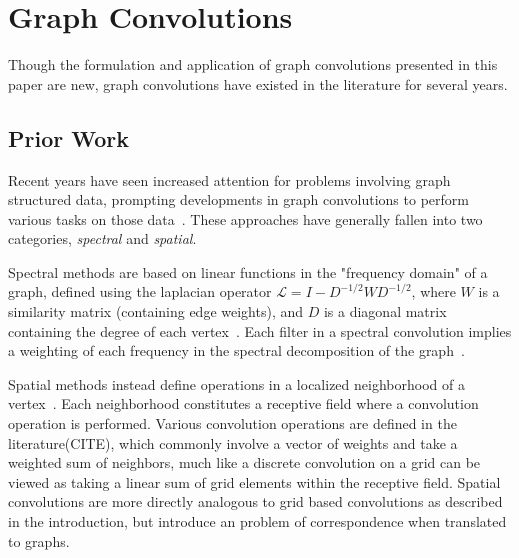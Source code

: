 \section{Graph Convolutions}
Though the formulation and application of graph convolutions presented in this paper are new, graph convolutions have existed in the literature for several years.


\subsection{Prior Work}
Recent years have seen increased attention for problems involving graph structured data, prompting developments in graph convolutions to perform various tasks on those data~\cite{bronstein2016}.
These approaches have generally fallen into two categories, \textit{spectral} and \textit{spatial}.

Spectral methods are based on linear functions in the "frequency domain" of a graph, defined using the laplacian operator $\mathcal{L}=I-D^{-1/2}WD^{-1/2}$, where $W$ is a similarity matrix (containing edge weights), and $D$ is a diagonal matrix containing the degree of each vertex~\cite{henaff2015}.
Each filter in a spectral convolution implies a weighting of each frequency in the spectral decomposition of the graph~\cite{mallat2009}.

Spatial methods instead define operations in a localized neighborhood of a vertex~\cite{henaff2015}.
Each neighborhood constitutes a receptive field where a convolution operation is performed. 
Various convolution operations are defined in the literature(CITE), which commonly involve a vector of weights and take a weighted sum of neighbors, much like a discrete convolution on a grid can be viewed as taking a linear sum of grid elements within the receptive field.
Spatial convolutions are more directly analogous to grid based convolutions as described in the introduction, but introduce an problem of correspondence when translated to graphs.

